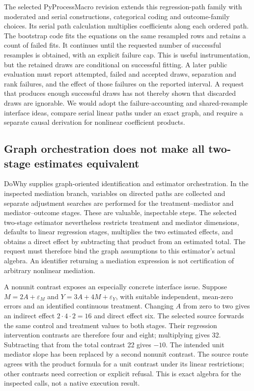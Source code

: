 The selected PyProcessMacro revision extends this regression-path family with moderated and serial constructions, categorical coding and outcome-family choices. Its serial path calculation multiplies coefficients along each ordered path. The bootstrap code fits the equations on the same resampled rows and retains a count of failed fits. It continues until the requested number of successful resamples is obtained, with an explicit failure cap. This is useful instrumentation, but the retained draws are conditional on successful fitting. A later public evaluation must report attempted, failed and accepted draws, separation and rank failures, and the effect of those failures on the reported interval. A request that produces enough successful draws has not thereby shown that discarded draws are ignorable. We would adopt the failure-accounting and shared-resample interface ideas, compare serial linear paths under an exact graph, and require a separate causal derivation for nonlinear coefficient products. \citep{exec25_pymed_process,exec25_pymed_choice}

\subsection{Graph orchestration does not make all two-stage estimates equivalent}
DoWhy supplies graph-oriented identification and estimator orchestration. In the inspected mediation branch, variables on directed paths are collected and separate adjustment searches are performed for the treatment--mediator and mediator--outcome stages. These are valuable, inspectable steps. The selected two-stage estimator nevertheless restricts treatment and mediator dimensions, defaults to linear regression stages, multiplies the two estimated effects, and obtains a direct effect by subtracting that product from an estimated total. The request must therefore bind the graph assumptions to this estimator's actual algebra. An identifier returning a mediation expression is not certification of arbitrary nonlinear mediation. \citep{exec25_pymed_dowhy}

A nonunit contrast exposes an especially concrete interface issue. Suppose $M=2A+\varepsilon_M$ and $Y=3A+4M+\varepsilon_Y$, with suitable independent, mean-zero errors and an identified continuous treatment. Changing $A$ from zero to two gives an indirect effect $2\cdot4\cdot2=16$ and direct effect six. The selected source forwards the same control and treatment values to both stages. Their regression intervention contrasts are therefore four and eight; multiplying gives 32. Subtracting that from the total contrast 22 gives $-10$. The intended unit mediator slope has been replaced by a second nonunit contrast. The source route agrees with the product formula for a unit contrast under its linear restrictions; other contrasts need correction or explicit refusal. This is exact algebra for the inspected calls, not a native execution result. \citep{exec25_pymed_dowhy,exec25_pymed_choice}

